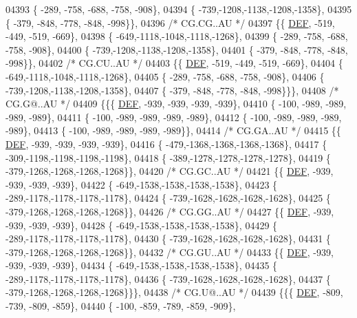 \begin{DoxyCode}
04393 \{ -289, -758, -688, -758, -908\},
04394 \{ -739,-1208,-1138,-1208,-1358\},
04395 \{ -379, -848, -778, -848, -998\}\},
04396 \textcolor{comment}{/* CG.CG..AU */}
04397 \{\{  \mbox{\hyperlink{1_88_84__epars_8h_a397419fc12b37ed479c8abb9d444d843}{DEF}}, -519, -449, -519, -669\},
04398 \{ -649,-1118,-1048,-1118,-1268\},
04399 \{ -289, -758, -688, -758, -908\},
04400 \{ -739,-1208,-1138,-1208,-1358\},
04401 \{ -379, -848, -778, -848, -998\}\},
04402 \textcolor{comment}{/* CG.CU..AU */}
04403 \{\{  \mbox{\hyperlink{1_88_84__epars_8h_a397419fc12b37ed479c8abb9d444d843}{DEF}}, -519, -449, -519, -669\},
04404 \{ -649,-1118,-1048,-1118,-1268\},
04405 \{ -289, -758, -688, -758, -908\},
04406 \{ -739,-1208,-1138,-1208,-1358\},
04407 \{ -379, -848, -778, -848, -998\}\}\},
04408 \textcolor{comment}{/* CG.G@..AU */}
04409 \{\{\{  \mbox{\hyperlink{1_88_84__epars_8h_a397419fc12b37ed479c8abb9d444d843}{DEF}}, -939, -939, -939, -939\},
04410 \{ -100, -989, -989, -989, -989\},
04411 \{ -100, -989, -989, -989, -989\},
04412 \{ -100, -989, -989, -989, -989\},
04413 \{ -100, -989, -989, -989, -989\}\},
04414 \textcolor{comment}{/* CG.GA..AU */}
04415 \{\{  \mbox{\hyperlink{1_88_84__epars_8h_a397419fc12b37ed479c8abb9d444d843}{DEF}}, -939, -939, -939, -939\},
04416 \{ -479,-1368,-1368,-1368,-1368\},
04417 \{ -309,-1198,-1198,-1198,-1198\},
04418 \{ -389,-1278,-1278,-1278,-1278\},
04419 \{ -379,-1268,-1268,-1268,-1268\}\},
04420 \textcolor{comment}{/* CG.GC..AU */}
04421 \{\{  \mbox{\hyperlink{1_88_84__epars_8h_a397419fc12b37ed479c8abb9d444d843}{DEF}}, -939, -939, -939, -939\},
04422 \{ -649,-1538,-1538,-1538,-1538\},
04423 \{ -289,-1178,-1178,-1178,-1178\},
04424 \{ -739,-1628,-1628,-1628,-1628\},
04425 \{ -379,-1268,-1268,-1268,-1268\}\},
04426 \textcolor{comment}{/* CG.GG..AU */}
04427 \{\{  \mbox{\hyperlink{1_88_84__epars_8h_a397419fc12b37ed479c8abb9d444d843}{DEF}}, -939, -939, -939, -939\},
04428 \{ -649,-1538,-1538,-1538,-1538\},
04429 \{ -289,-1178,-1178,-1178,-1178\},
04430 \{ -739,-1628,-1628,-1628,-1628\},
04431 \{ -379,-1268,-1268,-1268,-1268\}\},
04432 \textcolor{comment}{/* CG.GU..AU */}
04433 \{\{  \mbox{\hyperlink{1_88_84__epars_8h_a397419fc12b37ed479c8abb9d444d843}{DEF}}, -939, -939, -939, -939\},
04434 \{ -649,-1538,-1538,-1538,-1538\},
04435 \{ -289,-1178,-1178,-1178,-1178\},
04436 \{ -739,-1628,-1628,-1628,-1628\},
04437 \{ -379,-1268,-1268,-1268,-1268\}\}\},
04438 \textcolor{comment}{/* CG.U@..AU */}
04439 \{\{\{  \mbox{\hyperlink{1_88_84__epars_8h_a397419fc12b37ed479c8abb9d444d843}{DEF}}, -809, -739, -809, -859\},
04440 \{ -100, -859, -789, -859, -909\},

\end{DoxyCode}
